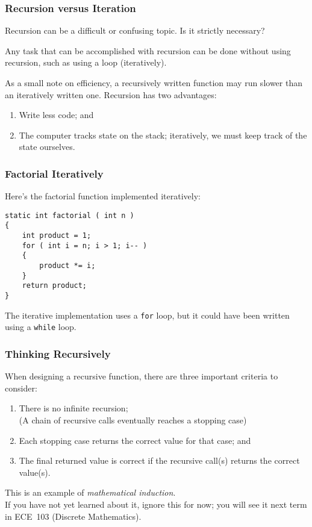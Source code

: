 \begin{frame}
\frametitle{Recursion versus Iteration}

Recursion can be a difficult or confusing topic. Is it strictly necessary?

Any task that can be accomplished with recursion can be done without using recursion, such as using a loop (iteratively).

As a small note on efficiency, a recursively written function may run slower than an iteratively written one. Recursion has two advantages:

\begin{enumerate}
	\item Write less code; and \\
	\item The computer tracks state on the stack; iteratively, we must keep track of the state ourselves.
\end{enumerate}

\end{frame}

\begin{frame}[fragile]
\frametitle{Factorial Iteratively}
Here's the factorial function implemented iteratively:

\begin{verbatim}
static int factorial ( int n )
{
    int product = 1;
    for ( int i = n; i > 1; i-- )
    {
        product *= i;
    }
    return product;
}
\end{verbatim}

The iterative implementation uses a \texttt{for} loop, but it could have been written using a \texttt{while} loop.

\end{frame}

\begin{frame}
\frametitle{Thinking Recursively}
When designing a recursive function, there are three important criteria to consider:

\begin{enumerate}
	\item There is no infinite recursion;\\
	\quad (A chain of recursive calls eventually reaches a stopping case)
	\item Each stopping case returns the correct value for that case; and
	\item The final returned value is correct if the recursive call(s) returns the correct value(s).
\end{enumerate}

This is an example of \textit{mathematical induction}.\\
If you have not yet learned about it, ignore this for now; you will see it next term in ECE~103 (Discrete Mathematics).

\end{frame}

